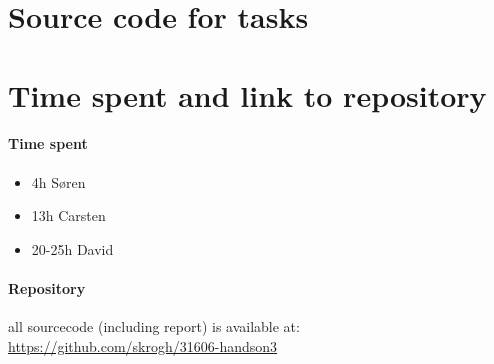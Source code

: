 


\newpage





\appendix

\section{Source code for tasks}






\section{Time spent and link to repository}

\paragraph{ Time spent }
\begin{itemize}
  \item 4h Søren
  \item 13h Carsten
  \item 20-25h David
\end{itemize}

\paragraph{ Repository }
all sourcecode (including report) is available at:
\url{ https://github.com/skrogh/31606-handson3 }



